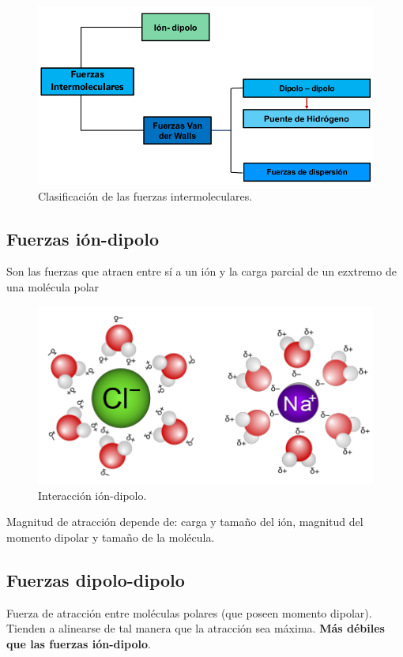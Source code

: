 \documentclass[]{article}
\begin{document}
\begin{figure}[H]
\center
\includegraphics[scale=0.32]{foto5.png}
\caption{Clasificación de las fuerzas intermoleculares.}
\end{figure}



\subsection{Fuerzas ión-dipolo}
Son las fuerzas que atraen entre sí a un ión y la carga parcial de un ezxtremo de una molécula polar

\begin{figure}[H]
\center
\includegraphics[scale=0.3]{foto6.png}
\caption{Interacción ión-dipolo.}
\end{figure}
 
Magnitud de atracción depende de: carga y tamaño del ión, magnitud del momento dipolar y tamaño de la molécula.



\subsection{Fuerzas dipolo-dipolo}
Fuerza de atracción entre moléculas polares (que poseen momento dipolar). Tienden a alinearse de tal manera que la atracción sea máxima. \textbf{Más débiles que las fuerzas ión-dipolo}.
\end{document}
